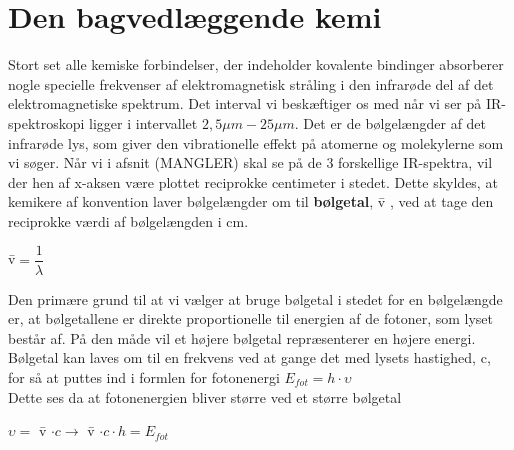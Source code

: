\section{Den bagvedlæggende kemi}
Stort set alle kemiske forbindelser, der indeholder kovalente bindinger absorberer nogle specielle frekvenser af elektromagnetisk stråling i den infrarøde del af det elektromagnetiske spektrum. Det interval vi beskæftiger os med når vi ser på IR-spektroskopi ligger i intervallet $2,5 \mu m- 25 \mu m $. Det er de bølgelængder af det infrarøde lys, som giver den vibrationelle effekt på atomerne og molekylerne som vi søger. Når vi i afsnit (MANGLER) skal se på de 3 forskellige IR-spektra, vil der hen af x-aksen være plottet reciprokke centimeter i stedet. Dette skyldes, at kemikere af konvention laver bølgelængder om til \textbf{bølgetal}, \={v} , ved at tage den reciprokke værdi af bølgelængden i cm. 

\begin{center}
\={v}$= \dfrac{1}{\lambda}$
\end{center}

Den primære grund til at vi vælger at bruge bølgetal i stedet for en bølgelængde er, at bølgetallene er direkte proportionelle til energien af de fotoner, som lyset består af. På den måde vil et højere bølgetal repræsenterer en højere energi. Bølgetal kan laves om til en frekvens ved at gange det med lysets hastighed, c, for så at puttes ind i formlen for fotonenergi $E_{fot} = h \cdot \upsilon$
\\
Dette ses da at fotonenergien bliver større ved et større bølgetal 
\\
\begin{center}
$\upsilon =$ \={v} $\cdot c \rightarrow$ \={v} $\cdot c \cdot h = E_{fot}$
\end{center}

